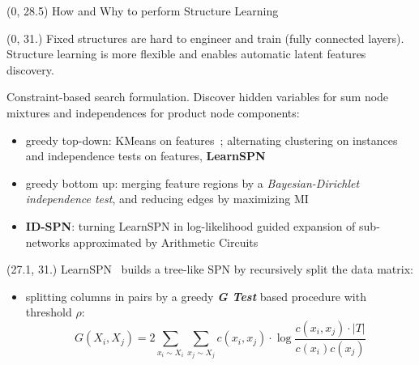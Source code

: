 \documentclass[final]{beamer}
\begin{document}
\begin{frame}{}
\begin{textblock}{25.7}
  \end{textblock}
  
  \begin{textblock}{80}(0, 28.5)
    How and Why to perform Structure Learning
    
  \end{textblock}
  
  \begin{textblock}{25.7}(0, 31.)
    \small
    Fixed structures are hard to engineer and train (fully connected
    layers). Structure learning is more flexible and enables automatic
    latent features discovery.\par
    
    Constraint-based search formulation. Discover hidden variables for sum node mixtures and independences
    for product node components:
    \begin{itemize}
      \itemsep 6pt
    \item greedy top-down: KMeans on features~\emph{\parencite{Dennis2012}}; alternating clustering on
      instances and independence tests on features, \textbf{LearnSPN}~\emph{\parencite{Gens2013}}
      
    \item greedy bottom up: merging feature regions by a \emph{Bayesian-Dirichlet independence test},  and reducing edges by maximizing MI\emph{~\parencite{Peharz2013}}

    \item \textbf{ID-SPN}: turning LearnSPN in log-likelihood guided expansion of sub-networks
      approximated by Arithmetic Circuits~\emph{\parencite{Rooshenas2014}}
      
    \end{itemize}
  \end{textblock}
  
  \begin{textblock}{25.7}(27.1, 31.)
    \footnotesize
    LearnSPN~\parencite{Gens2013} builds a tree-like SPN by recursively split the data matrix:

    \begin{itemize}
    \item splitting columns in pairs by a greedy \textbf{\emph{G Test}} based
      procedure with threshold $\rho$:
      \[
      G(X_i, X_j) =  2\sum_{x_i \sim X_i}\sum_{x_j \sim X_j}c(x_i, x_j)\cdot \log\frac{c(x_i, x_j)\cdot |T|}{c(x_i)c(x_j)}
      \]
 
      \end{itemize}
  \end{textblock}
  

\end{frame}
\end{document}
